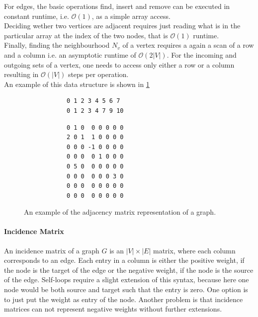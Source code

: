         For edges, the basic operations find, insert and remove can be executed in constant runtime, i.e. $\mathcal{O}(1)$, as a simple array access. \\
        
        Deciding wether two vertices are adjacent requires just reading what is in the particular array at the index of the two nodes, that is $\mathcal{O}(1)$ runtime.\\
        
        Finally, finding the neighbourhood $N_v$ of a vertex requires a again a scan of a row and a column i.e. an asymptotic runtime of $\mathcal{O}(2|V|)$. For the incoming and outgoing sets of a vertex, one needs to access only either a row or a column resulting in $\mathcal{O}(|V|)$ steps per operation. \\
        
        An example of this data structure is shown in \ref{adm}
        
        \begin{figure}[htp]
         \begin{center}
         \begin{verbatim}
            0 1 2 3 4 5 6 7
            0 1 2 3 4 7 9 10
          \end{verbatim}
          \begin{verbatim}
            0 1 0  0 0 0 0 0
            2 0 1  1 0 0 0 0
            0 0 0 -1 0 0 0 0
            0 0 0  0 1 0 0 0
            0 5 0  0 0 0 0 0
            0 0 0  0 0 0 3 0
            0 0 0  0 0 0 0 0
            0 0 0  0 0 0 0 0
          \end{verbatim}
         \end{center}
         \caption{An example of the adjacency matrix representation of a graph.}
         \label{adm}
        \end{figure}
        
        \paragraph{Incidence Matrix}
        An incidence matrix of a graph $G$ is an $|V| \times |E|$ matrix, where each column corresponds to an edge. Each entry in a column is either the positive weight, if the node is the target of the edge or the negative weight, if the node is the source of the edge. Self-loops require a slight extension of this syntax, because here one node would be both source and target such that the entry is zero. One option is to just put the weight as entry of the node.  Another problem is that incidence matrices can not represent negative weights without further extensions. \\
        
